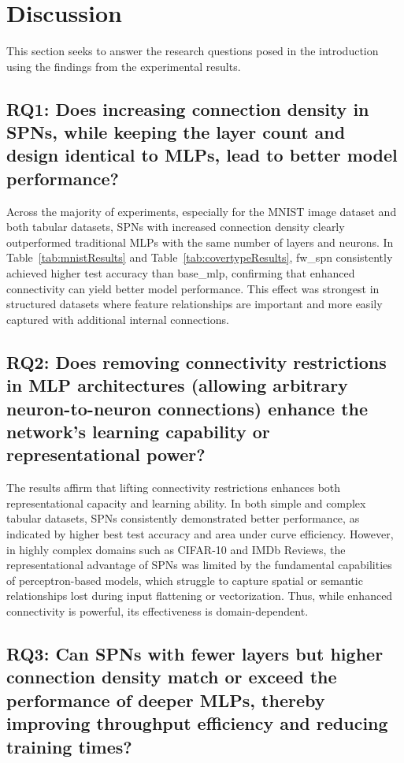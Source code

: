 \section{Discussion}

This section seeks to answer the research questions posed in the introduction using the findings from the experimental results.

\subsection*{RQ1: Does increasing connection density in SPNs, while keeping the layer count and design identical to MLPs, lead to better model performance?}

Across the majority of experiments, especially for the MNIST image dataset and both tabular datasets, SPNs with increased connection density clearly outperformed traditional MLPs with the same number of layers and neurons. In Table~\ref{tab:mnistResults} and Table~\ref{tab:covertypeResults}, fw\_spn consistently achieved higher test accuracy than base\_mlp, confirming that enhanced connectivity can yield better model performance. This effect was strongest in structured datasets where feature relationships are important and more easily captured with additional internal connections.

\subsection*{RQ2: Does removing connectivity restrictions in MLP architectures (allowing arbitrary neuron-to-neuron connections) enhance the network’s learning capability or representational power?}

The results affirm that lifting connectivity restrictions enhances both representational capacity and learning ability. In both simple and complex tabular datasets, SPNs consistently demonstrated better performance, as indicated by higher best test accuracy and area under curve efficiency. However, in highly complex domains such as CIFAR-10 and IMDb Reviews, the representational advantage of SPNs was limited by the fundamental capabilities of perceptron-based models, which struggle to capture spatial or semantic relationships lost during input flattening or vectorization. Thus, while enhanced connectivity is powerful, its effectiveness is domain-dependent.

\subsection*{RQ3: Can SPNs with fewer layers but higher connection density match or exceed the performance of deeper MLPs, thereby improving throughput efficiency and reducing training times?}

